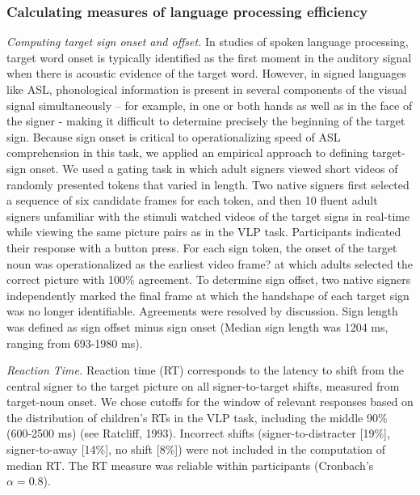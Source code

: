 \documentclass[oneside]{report}
\begin{document}
\subsubsection{Calculating measures of language processing
efficiency}\label{calculating-measures-of-language-processing-efficiency}

\emph{Computing target sign onset and offset.} In studies of spoken
language processing, target word onset is typically identified as the
first moment in the auditory signal when there is acoustic evidence of
the target word. However, in signed languages like ASL, phonological
information is present in several components of the visual signal
simultaneously -- for example, in one or both hands as well as in the
face of the signer - making it difficult to determine precisely the
beginning of the target sign. Because sign onset is critical to
operationalizing speed of ASL comprehension in this task, we applied an
empirical approach to defining target-sign onset. We used a gating task
in which adult signers viewed short videos of randomly presented tokens
that varied in length. Two native signers first selected a sequence of
six candidate frames for each token, and then 10 fluent adult signers
unfamiliar with the stimuli watched videos of the target signs in
real-time while viewing the same picture pairs as in the VLP task.
Participants indicated their response with a button press. For each sign
token, the onset of the target noun was operationalized as the earliest
video frame? at which adults selected the correct picture with 100\%
agreement. To determine sign offset, two native signers independently
marked the final frame at which the handshape of each target sign was no
longer identifiable. Agreements were resolved by discussion. Sign length
was defined as sign offset minus sign onset (Median sign length was 1204
ms, ranging from 693-1980 ms).

\emph{Reaction Time.} Reaction time (RT) corresponds to the latency to
shift from the central signer to the target picture on all
signer-to-target shifts, measured from target-noun onset. We chose
cutoffs for the window of relevant responses based on the distribution
of children's RTs in the VLP task, including the middle 90\% (600-2500
ms) (see Ratcliff, 1993). Incorrect shifts (signer-to-distracter
{[}19\%{]}, signer-to-away {[}14\%{]}, no shift {[}8\%{]}) were not
included in the computation of median RT. The RT measure was reliable
within participants (Cronbach's \(\alpha = 0.8\)).
\end{document}
